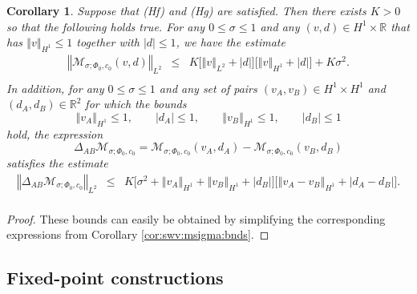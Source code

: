 \documentclass[10pt]{articleHJ}
\newcommand{\Real}{\mathbb{R}}							%
\newcommand{\abs}[1]{\left\vert#1\right\vert}			%
\newcommand{\norm}[1]{\left\Vert#1\right\Vert}		%
\newtheorem{cor}[thm]{Corollary}
\numberwithin{equation}{section}
\begin{document}
\begin{cor}
\label{cor:swv:msigma:bnds:phi:zero}
Suppose that (Hf) and (Hg)
are satisfied.
Then there exists
$K > 0$ so that the following
holds true.
For any
$0 \le \sigma \le 1$
and any
$(v, d) \in H^1 \times \Real$
that has $\norm{v}_{H^1} \le 1$
together with $\abs{d} \le 1$,
we have the estimate
\begin{equation}
\label{eq:swv:msigma:glb:bnd:short}
\begin{array}{lcl}
 \norm{\mathcal{M}_{\sigma;\Phi_0, c_0}(v, d)}_{L^2} & \le &
    K  \big[ \norm{v}_{L^2} + \abs{d}   \big]
        \big[
    \norm{v}_{H^1} + \abs{d}
  \big]
  + K \sigma^2 .
\\[0.2cm]
\end{array}
\end{equation}
In addition, for any $0 \le \sigma \le 1$
and any set of pairs
$(v_A, v_B) \in H^1 \times H^1$
and $(d_A, d_B) \in \Real^2$
for which the bounds
\begin{equation}
\norm{v_{A}}_{H^1} \le 1,
\qquad
\abs{d_{A}} \le 1,
\qquad
\norm{v_{B}}_{H^1} \le 1,
\qquad
\abs{d_B} \le 1
\end{equation}
hold,
the expression
\begin{equation}
\Delta_{AB} \mathcal{M}_{\sigma;\Phi_0, c_0}
 = \mathcal{M}_{\sigma;\Phi_0, c_0}(v_A, d_A)
 - \mathcal{M}_{\sigma;\Phi_0, c_0}(v_B, d_B)
\end{equation}
satisfies the estimate
\begin{equation}
\label{eq:swv:msigma:lip:bnd:short}
\begin{array}{lcl}
\norm{\Delta_{AB} \mathcal{M}_{\sigma;\Phi_0, c_0} }_{L^2}
  & \le &
    K \big[
  \sigma^2 + \norm{v_A}_{H^1} + \norm{v_B}_{H^1} +  \abs{d_B}
    \big]
  \big[
     \norm{v_A-v_B}_{H^1}
      + \abs{d_A - d_B}
  \big] .
\\[0.2cm]
\end{array}
\end{equation}
%
\end{cor}
\begin{proof}
These bounds can easily be obtained by
simplifying the corresponding expressions from
Corollary \ref{cor:swv:msigma:bnds}.
\end{proof}



\subsection{Fixed-point constructions}
\label{sec:swv:fixp}
\end{document}
